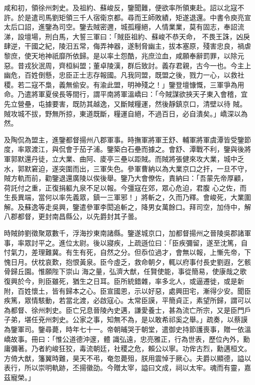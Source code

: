 \begin{pinyinscope}
 咸和初，領徐州刺史。及祖約、蘇峻反，鑒聞難，便欲率所領東赴。詔以北寇不許。於是遣司馬劉矩領三千人宿衛京都。尋而王師敗績，矩遂退還。中書令庾亮宣太后口詔，進鑒為司空。鑒去賊密邇，城孤糧絕，人情業業，莫有固志，奉詔流涕，設壇場，刑白馬，大誓三軍曰：「賊臣祖約、蘇峻不恭天命，
 不畏王誅，凶戾肆逆，干國之紀，陵汨五常，侮弄神器，遂制脅幽主，拔本塞原，殘害忠良，禍虐黎庶，使天地神祇靡所依歸。是以率土怨酷，兆庶泣血，咸願奉辭罰罪，以除元惡。昔戎狄泯周，齊桓糾盟；董卓陵漢，群后致討。義存君親，古今一也。今主上幽危，百姓倒懸，忠臣正士志存報國。凡我同盟，既盟之後，戮力一心，以救社稷。若二寇不梟，義無偷安。有渝此盟，明神殘之！」鑒登壇慷慨，三軍爭為用命。乃遣將軍夏侯長等間行，謂平南將軍溫嶠曰：「今賊謀欲挾天子東入會稽，宜先立營壘，屯據要害，既防其越逸，又斷賊糧運，然後靜鎮京口，清壁以待
 賊。賊攻城不拔，野無所掠，東道既斷，糧運自絕，不過百日，必自潰矣。」嶠深以為然。



 及陶侃為盟主，進鑒都督揚州八郡軍事。時撫軍將軍王舒、輔軍將軍虞潭皆受鑒節度，率眾渡江，與侃會于茄子浦。鑒築白石壘而據之。會舒、潭戰不利，鑒與後將軍郭默還丹徒，立大業、曲阿、庱亭三壘以距賊。而賊將張健來攻大業，城中乏水，郭默窘迫，遂突圍而出，三軍失色。參軍曹納以為大業京口之扞，一旦不守，賊方軌而前，勸鑒退還廣陵以俟後舉。鑒乃大會僚佐，責納曰：「吾蒙先帝厚顧，荷託付之重，正復捐軀九泉不足以報。今彊寇在郊，眾心危迫，君腹
 心之佐，而生長異端，當何以率先義眾，鎮一三軍邪！」將斬之，久而乃釋。會峻死，大業圍解。及蘇逸等走吳興，鑒遣參軍李閎追斬之，降男女萬餘口。拜司空，加侍中，解八郡都督，更封南昌縣公，以先爵封其子曇。



 時賊帥劉徵聚眾數千，浮海抄東南諸縣。鑒遂城京口，加都督揚州之晉陵吳郡諸軍事，率眾討平之。進位太尉。後以寢疾，上疏遜位曰：「臣疾彌留，遂至沈篤，自忖氣力，差理難冀。有生有死，自然之分。但忝位過才，會無以報，上慚先帝，下愧日月。伏枕哀歎，抱恨黃泉。臣今虛乏，救命朝夕，輒以府事付長史劉遐，乞骸骨歸丘園。惟願陛下崇山
 海之量，弘濟大猷，任賢使能，事從簡易，使康哉之歌復興於今，則臣雖死，猶生之日耳。臣所統錯雜，率多北人，或逼遷徙，或是新附，百姓懷土，皆有歸本之心。臣宣國恩，示以好惡，處興田宅，漸得少安。聞臣疾篤，眾情駭動，若當北渡，必啟寇心。太常臣謨，平簡貞正，素望所歸，謂可以為都督、徐州刺史。臣亡兄息晉陵內史邁，謙愛養士，甚為流亡所宗，又是臣門戶子弟，堪任兗州刺史。公家之事，知無不為，是以敢希祁奚之舉。」疏奏，以蔡謨為鑒軍司。鑒尋薨，時年七十一。帝朝晡哭于朝堂，遣御史持節護喪事，贈一依溫嶠故事。冊曰：「惟公道德沖邃，體
 識弘遠，忠亮雅正，行為世表，歷位內外，勳庸彌著。乃者約峻狂狡，毒流朝廷，社稷之危，賴公以寧。功侔古烈，勳邁桓文。方倚大猷，籓翼時難，昊天不弔，奄忽薨殂，朕用震悼于厥心。夫爵以顯德，謚以表行，所以崇明軌跡，丕揚徽劭。今贈太宰，謚曰文成，祠以太牢。魂而有靈，嘉茲寵榮。」




\end{pinyinscope}
